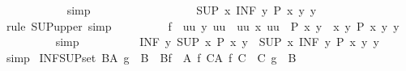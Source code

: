 \begin{isabellebody}
\ \ \ \ \ \ \ \ \ \ \isamarkupfalse%
\ simp\isanewline
\ \ \ \ \ \ \isamarkupfalse%
\isanewline
\ \ \ \ \ \ \isamarkupfalse%
\ \isamarkupfalse%
\ {\isachardoublequoteopen}{\isachardot}{\kern0pt}{\isachardot}{\kern0pt}{\isachardot}{\kern0pt}\ {\isasymle}\ {\isacharparenleft}{\kern0pt}SUP\ x{\isachardot}{\kern0pt}\ INF\ y{\isachardot}{\kern0pt}\ P\ {\isacharparenleft}{\kern0pt}x\ y{\isacharparenright}{\kern0pt}\ y{\isacharparenright}{\kern0pt}{\isachardoublequoteclose}\isanewline
\ \ \ \ \ \ \ \ \isamarkupfalse%
\ {\isacharparenleft}{\kern0pt}rule\ SUP{\isacharunderscore}{\kern0pt}upper{\isacharcomma}{\kern0pt}\ simp{\isacharparenright}{\kern0pt}\isanewline
\ \ \ \ \ \ \isamarkupfalse%
\ \isamarkupfalse%
\ {\isachardoublequoteopen}{\isasymSqinter}{\isacharparenleft}{\kern0pt}f\ {\isacharbackquote}{\kern0pt}\ {\isacharbraceleft}{\kern0pt}uu{\isachardot}{\kern0pt}\ {\isasymexists}y{\isachardot}{\kern0pt}\ uu\ {\isacharequal}{\kern0pt}\ {\isacharbraceleft}{\kern0pt}uu{\isachardot}{\kern0pt}\ {\isasymexists}x{\isachardot}{\kern0pt}\ uu\ {\isacharequal}{\kern0pt}\ P\ x\ y{\isacharbraceright}{\kern0pt}{\isacharbraceright}{\kern0pt}{\isacharparenright}{\kern0pt}\ {\isasymle}\ {\isacharparenleft}{\kern0pt}{\isasymSqunion}x{\isachardot}{\kern0pt}\ {\isasymSqinter}y{\isachardot}{\kern0pt}\ P\ {\isacharparenleft}{\kern0pt}x\ y{\isacharparenright}{\kern0pt}\ y{\isacharparenright}{\kern0pt}{\isachardoublequoteclose}\isanewline
\ \ \ \ \ \ \ \ \isamarkupfalse%
\ simp\isanewline
\ \ \ \ \isamarkupfalse%
\isanewline
\ \ \isamarkupfalse%
\ \isamarkupfalse%
\ {\isachardoublequoteopen}{\isacharparenleft}{\kern0pt}INF\ y{\isachardot}{\kern0pt}\ SUP\ x{\isachardot}{\kern0pt}\ P\ x\ y{\isacharparenright}{\kern0pt}\ {\isasymle}\ {\isacharparenleft}{\kern0pt}SUP\ x{\isachardot}{\kern0pt}\ INF\ y{\isachardot}{\kern0pt}\ P\ {\isacharparenleft}{\kern0pt}x\ y{\isacharparenright}{\kern0pt}\ y{\isacharparenright}{\kern0pt}{\isachardoublequoteclose}\isanewline
\ \ \ \ \isamarkupfalse%
\ simp\isanewline
{}\isamarkupfalse%
%
\endisatagproof
{\isafoldproof}%
%
\isadelimproof
\isanewline
%
\endisadelimproof
\isanewline
{}\isamarkupfalse%
\ INF{\isacharunderscore}{\kern0pt}SUP{\isacharunderscore}{\kern0pt}set{\isacharcolon}{\kern0pt}\ {\isachardoublequoteopen}{\isacharparenleft}{\kern0pt}{\isasymSqinter}B{\isasymin}A{\isachardot}{\kern0pt}\ {\isasymSqunion}{\isacharparenleft}{\kern0pt}g\ {\isacharbackquote}{\kern0pt}\ B{\isacharparenright}{\kern0pt}{\isacharparenright}{\kern0pt}\ {\isacharequal}{\kern0pt}\ {\isacharparenleft}{\kern0pt}{\isasymSqunion}B{\isasymin}{\isacharbraceleft}{\kern0pt}f\ {\isacharbackquote}{\kern0pt}\ A\ {\isacharbar}{\kern0pt}f{\isachardot}{\kern0pt}\ {\isasymforall}C{\isasymin}A{\isachardot}{\kern0pt}\ f\ C\ {\isasymin}\ C{\isacharbraceright}{\kern0pt}{\isachardot}{\kern0pt}\ {\isasymSqinter}{\isacharparenleft}{\kern0pt}g\ {\isacharbackquote}{\kern0pt}\ B{\isacharparenright}{\kern0pt}{\isacharparenright}{\kern0pt}{\isachardoublequoteclose}\isanewline

\end{isabellebody}
